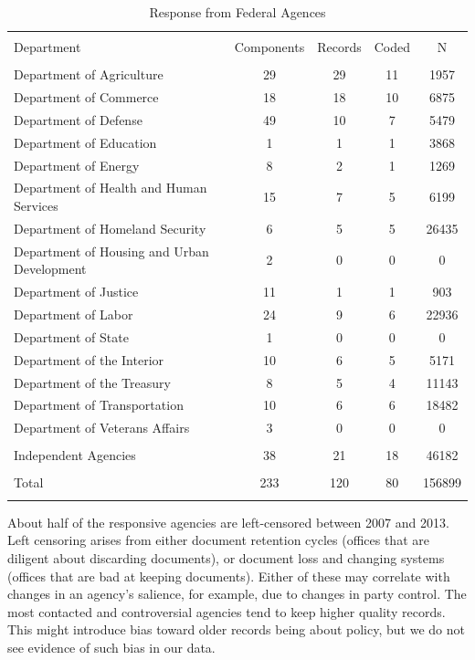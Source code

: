 \documentclass{article}
\begin{document}
\begin{table}[!htbp] \centering 
  \caption{Response from Federal Agences} 
  \label{responserates} 
\begin{tabular}{@{\extracolsep{5pt}} lcccc} 
\\[-1.8ex]\hline 
\hline \\[-1.8ex] 
Department & Components & Records & Coded & N \\ 
\hline \\[-1.8ex] 
Department of Agriculture & 29 & 29 & 11 & 1957 \\ 
Department of Commerce & 18 & 18 & 10 & 6875 \\ 
Department of Defense & 49 & 10 & 7 & 5479 \\ 
Department of Education & 1 & 1 & 1 & 3868 \\ 
Department of Energy & 8 & 2 & 1 & 1269 \\ 
Department of Health and Human Services & 15 & 7 & 5 & 6199 \\ 
Department of Homeland Security & 6 & 5 & 5 & 26435 \\ 
Department of Housing and Urban Development & 2 & 0 & 0 & 0 \\ 
Department of Justice & 11 & 1 & 1 & 903 \\ 
Department of Labor & 24 & 9 & 6 & 22936 \\ 
Department of State & 1 & 0 & 0 & 0 \\ 
Department of the Interior & 10 & 6 & 5 & 5171 \\ 
Department of the Treasury & 8 & 5 & 4 & 11143 \\ 
Department of Transportation & 10 & 6 & 6 & 18482 \\ 
Department of Veterans Affairs & 3 & 0 & 0 & 0 \\ 
\hline \\[-1.8ex] 
Independent Agencies & 38 & 21 & 18 & 46182 \\ 
\hline \\[-1.8ex] 
Total & 233 & 120 & 80 & 156899 \\ 
\hline \\[-1.8ex] 
\end{tabular} 
\end{table} 

About half of the responsive agencies are left-censored between 2007 and 2013. Left censoring arises from either document retention cycles (offices that are diligent about discarding documents), or document loss and changing systems (offices that are bad at keeping documents). Either of these may correlate with changes in an agency's salience, for example, due to changes in party control. 
The most contacted and controversial agencies tend to keep higher quality records. 
This might introduce bias toward older records being about policy, but we do not see evidence of such bias in our data. 
\end{document}
